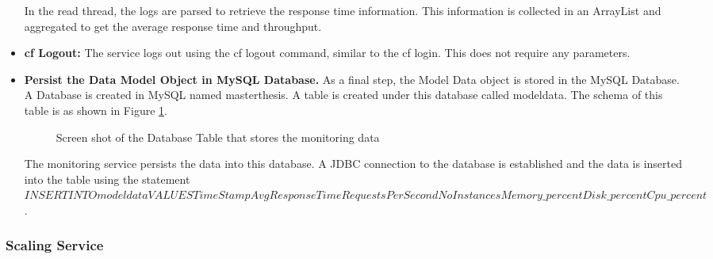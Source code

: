 \documentclass[article,type=msc,colorback,12pt,accentcolor=tud8b,table]{tudthesis}
\begin{document}
\begin{itemize}
In the read thread, the logs are parsed to retrieve the response time information. This information is collected in an ArrayList and aggregated to get the average response time and throughput. 
		
\item{\textbf{\gls{cf} Logout:}} The service logs out using the cf logout command, similar to the cf login. This does not require any parameters.
		
\item{\textbf{Persist the Data Model Object in MySQL Database.}} As  a final step, the Model Data object is stored in the MySQL Database. A Database is created in MySQL named masterthesis. A table is created under this database called modeldata. The schema of this table is as shown in Figure \ref{fig:database_schema_screenshot}.

 \begin{figure}[h]
 	\begin{center}
 		\makebox[\textwidth]{\texttt{[image: D5]}}
 	\end{center}
 	\caption{Screen shot of the Database Table that stores the monitoring data}
 	\label{fig:database_schema_screenshot}
 \end{figure}	

The monitoring service persists the data into this database. A JDBC connection to the database is established and the data is inserted into the table using the statement $INSERT INTO modeldata VALUES TimeStamp AvgResponseTime RequestsPerSecond NoInstances Memory\_percent Disk\_percent Cpu\_percent$.

		
\end{itemize}	
\subsubsection{Scaling Service}
	
\end{document}
